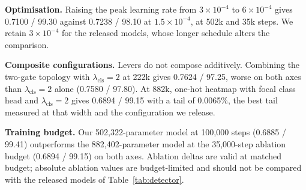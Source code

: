 \documentclass[10pt,twocolumn,letterpaper]{article}
\begin{document}
\textbf{Optimisation.} Raising the peak learning rate from $3\times10^{-4}$ to $6\times10^{-4}$
gives 0.7100 / 99.30 against 0.7238 / 98.10 at $1.5\times10^{-4}$, at 502k and 35k steps. We retain
$3\times10^{-4}$ for the released models, whose longer schedule alters the comparison.

\textbf{Composite configurations.} Levers do not compose additively. Combining the two-gate
topology with $\lambda_{\mathrm{cls}}=2$ at 222k gives 0.7624 / 97.25, worse on both axes than
$\lambda_{\mathrm{cls}}=2$ alone (0.7580 / 97.80). At 882k, one-hot heatmap with focal class head
and $\lambda_{\mathrm{cls}}=2$ gives 0.6894 / 99.15 with a tail of 0.0065\%, the best tail measured
at that width and the configuration we release.

\textbf{Training budget.} Our 502,322-parameter model at 100,000 steps (0.6885 / 99.41) outperforms
the 882,402-parameter model at the 35,000-step ablation budget (0.6894 / 99.15) on both axes.
Ablation deltas are valid at matched budget; absolute ablation values are budget-limited and should
not be compared with the released models of Table~\ref{tab:detector}.
\end{document}
